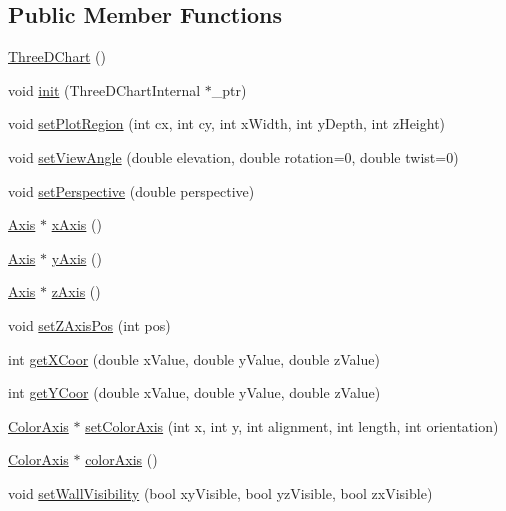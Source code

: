 \subsection*{Public Member Functions}
\begin{DoxyCompactItemize}
\item 
\hyperlink{class_three_d_chart_a19702e8a6eec6ba90e015a07b5ea4a01}{Three\+D\+Chart} ()
\item 
void \hyperlink{class_three_d_chart_a5ba1408237d21a7d894d212d4a2ca857}{init} (Three\+D\+Chart\+Internal $\ast$\+\_\+ptr)
\item 
void \hyperlink{class_three_d_chart_a5c462fd933130bfb21c0d0b09af6f281}{set\+Plot\+Region} (int cx, int cy, int x\+Width, int y\+Depth, int z\+Height)
\item 
void \hyperlink{class_three_d_chart_a04d610c665d0c550865e89ad5036a660}{set\+View\+Angle} (double elevation, double rotation=0, double twist=0)
\item 
void \hyperlink{class_three_d_chart_af26e93cca1757657cd419ec7efae330c}{set\+Perspective} (double perspective)
\item 
\hyperlink{class_axis}{Axis} $\ast$ \hyperlink{class_three_d_chart_a60544422121d19e5fdcf57de931cd123}{x\+Axis} ()
\item 
\hyperlink{class_axis}{Axis} $\ast$ \hyperlink{class_three_d_chart_a3b2b3f30cdd1a79a0bb7712c36c77fa7}{y\+Axis} ()
\item 
\hyperlink{class_axis}{Axis} $\ast$ \hyperlink{class_three_d_chart_a94da9716d472e2221f6f17a4ed30fa00}{z\+Axis} ()
\item 
void \hyperlink{class_three_d_chart_a671db5985c3fa486e6e693153bf4ad18}{set\+Z\+Axis\+Pos} (int pos)
\item 
int \hyperlink{class_three_d_chart_a816f5ea854803cabe8d6e5f1043226fb}{get\+X\+Coor} (double x\+Value, double y\+Value, double z\+Value)
\item 
int \hyperlink{class_three_d_chart_a3ce077296571d861d9124d59dd0459b0}{get\+Y\+Coor} (double x\+Value, double y\+Value, double z\+Value)
\item 
\hyperlink{class_color_axis}{Color\+Axis} $\ast$ \hyperlink{class_three_d_chart_a23f0c5861b70941b12c96e45d7f3a754}{set\+Color\+Axis} (int x, int y, int alignment, int length, int orientation)
\item 
\hyperlink{class_color_axis}{Color\+Axis} $\ast$ \hyperlink{class_three_d_chart_a1c73565a367bcc835097a8dbceebaf7b}{color\+Axis} ()
\item 
void \hyperlink{class_three_d_chart_aae30e639c65f6232decc2c34e4e8b518}{set\+Wall\+Visibility} (bool xy\+Visible, bool yz\+Visible, bool zx\+Visible)

\end{DoxyCompactItemize}

